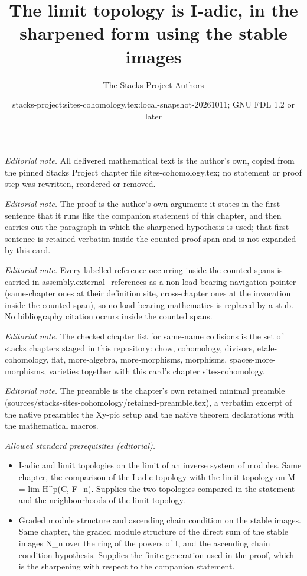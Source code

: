 \documentclass[10pt,a4paper]{amsart}
\title{The limit topology is I-adic, in the sharpened form using the stable images}
\author{The Stacks Project Authors}
\date{stacks-project:sites-cohomology.tex:local-snapshot-20261011; GNU FDL 1.2 or later}
\theoremstyle{plain}
\theoremstyle{definition}
\theoremstyle{remark}
\numberwithin{equation}{subsection}
\begin{document}
\maketitle
\noindent\textit{Editorial note.} All delivered mathematical text is the author's own, copied from the pinned Stacks Project chapter file sites-cohomology.tex; no statement or proof step was rewritten, reordered or removed.\par\medskip
\noindent\textit{Editorial note.} The proof is the author's own argument: it states in the first sentence that it runs like the companion statement of this chapter, and then carries out the paragraph in which the sharpened hypothesis is used; that first sentence is retained verbatim inside the counted proof span and is not expanded by this card.\par\medskip
\noindent\textit{Editorial note.} Every labelled reference occurring inside the counted spans is carried in assembly.external\_references as a non-load-bearing navigation pointer (same-chapter ones at their definition site, cross-chapter ones at the invocation inside the counted span), so no load-bearing mathematics is replaced by a stub. No bibliography citation occurs inside the counted spans.\par\medskip
\noindent\textit{Editorial note.} The checked chapter list for same-name collisions is the set of stacks chapters staged in this repository: chow, cohomology, divisors, etale-cohomology, flat, more-algebra, more-morphisms, morphisms, spaces-more-morphisms, varieties together with this card's chapter sites-cohomology.\par\medskip
\noindent\textit{Editorial note.} The preamble is the chapter's own retained minimal preamble (sources/stacks-sites-cohomology/retained-preamble.tex), a verbatim excerpt of the native preamble: the Xy-pic setup and the native theorem declarations with the mathematical macros.\par\medskip
\noindent\textit{Allowed standard prerequisites (editorial).}\begin{itemize}
\item I-adic and limit topologies on the limit of an inverse system of modules. Same chapter, the comparison of the I-adic topology with the limit topology on M = lim H\textasciicircum{}p(C, F\_n). Supplies the two topologies compared in the statement and the neighbourhoods of the limit topology.
\item Graded module structure and ascending chain condition on the stable images. Same chapter, the graded module structure of the direct sum of the stable images N\_n over the ring of the powers of I, and the ascending chain condition hypothesis. Supplies the finite generation used in the proof, which is the sharpening with respect to the companion statement.
\end{itemize}\medskip
\end{document}
